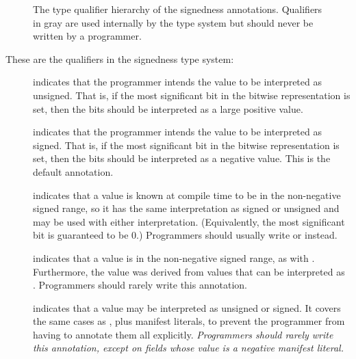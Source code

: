 \begin{figure}
\caption{The type qualifier hierarchy of the signedness annotations.
Qualifiers in gray are used internally by the type system but should never be written by a programmer.}
\label{fig-signedness-hierarchy}
\end{figure}

These are the qualifiers in the signedness type system:

\begin{description}

\item[]
    indicates that the programmer intends the value to be
    interpreted as unsigned.
    That is, if the most significant bit in the bitwise representation is
    set, then the bits should be interpreted as a large positive value.

\item[]
    indicates that the programmer intends the value to be
    interpreted as signed.
    That is, if the most significant bit in the bitwise representation is
    set, then the bits should be interpreted as a negative value.
    This is the default annotation.

\item[]
    indicates that a value is known at compile time to be in the non-negative
    signed range, so it has the same interpretation as signed or unsigned
    and may be used with either interpretation.  (Equivalently, the most
    significant bit is guaranteed to be 0.)  Programmers should usually
    write  or
     instead.

\item[]
    indicates that a value is in the non-negative signed range, as with
    .  Furthermore,
    the value was derived from values that can be interpreted as
    .  Programmers should
    rarely write this annotation.

\item[]
    indicates that a value may be interpreted as unsigned or signed.  It
    covers the same cases as
    , plus manifest literals, to
    prevent the programmer from having to annotate them all explicitly.
    \emph{Programmers should rarely write this annotation,
    except on fields whose value is a negative manifest literal.}


\end{description}
